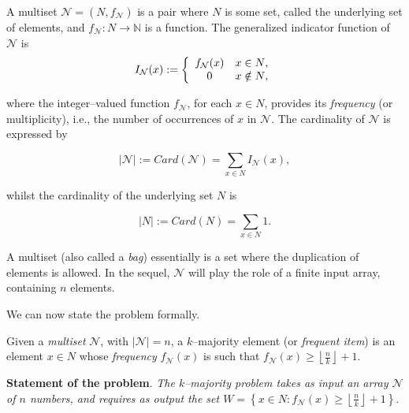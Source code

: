 \documentclass[final,3p,times]{elsarticle}
\newcommand\noi{\noindent}
\begin{document}
\begin{defn}
\label{multiset}
A multiset $\mathcal{N}=(N, f_{\mathcal{N}})$ is a pair where $N$ is some set, called the underlying set of elements, and $f_{\mathcal{N}}: N \rightarrow \mathbb{N}$ is a function.
The generalized indicator function of $\mathcal{N}$ is 
\begin{equation}
\label{eq01}
I_\mathcal{N} (x) := \left\{ {\begin{array}{*{20}c}
   {f_{\mathcal{N}}(x)} & {x \in N} , \\
   0 & {x \notin N},  \\
 \end{array} }\right.
 \end{equation}
 
\noindent where the integer--valued function $f_{\mathcal{N}}$, for each $x \in N$, provides its  \textit{frequency} (or multiplicity), i.e., the number of occurrences of $x$ in $\mathcal{N}$. 
\noi The cardinality of $\mathcal{N}$ is expressed by


\begin{equation}
\label{eq02}
\left\vert{\mathcal{N}}\right\vert := Card(\mathcal{N}) = \sum\limits_{x \in N} {I_\mathcal{N} (x)},
\end{equation}

\noi whilst the cardinality of the underlying set $N$ is

\begin{equation}
\label{eq03}
\left\vert{N}\right\vert := Card(N) = \sum\limits_{x \in N} {1}.
\end{equation}
\end{defn}

\noindent A multiset (also called a \emph{bag}) essentially is a set where the duplication of elements is allowed. In the sequel, $\mathcal{N}$ will play the role of a finite
input array, containing $n$ elements.

We can now state the problem formally.

\begin{defn}
\label{def2}
Given a \emph{multiset} $\mathcal{N}$, with $\left\vert{\mathcal{N}}\right\vert=n$, a $k$--majority element (or \emph{frequent item}) is an element $x\in N$ whose \emph{frequency} $f_{\mathcal{N}}(x)$ is such
that  $f_{\mathcal{N}}(x) \geq \left\lfloor {\frac{n}{k}} \right\rfloor+1$.
\end{defn}

\textbf{Statement of the problem}. \textit{The $k$--majority problem takes as input an array $\mathcal{N}$ of $n$ numbers, and requires as output the set $W = \left\{x \in N: f_{\mathcal{N}}(x)
\geq \left\lfloor {\frac{n}{k}} \right\rfloor+1\right\}$}.
\end{document}
